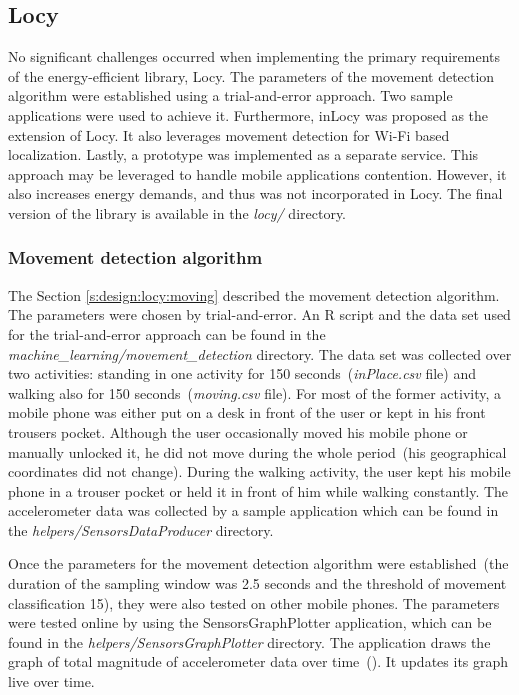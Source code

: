 \subsection{Locy}
\hspace{10pt} No significant challenges occurred when implementing the primary requirements of the energy-efficient library, Locy. The parameters of the movement detection algorithm were established using a trial-and-error approach. Two sample applications were used to achieve it. Furthermore, inLocy was proposed as the extension of Locy. It also leverages movement detection for Wi-Fi based localization. Lastly, a prototype was implemented as a separate service. This approach may be leveraged to handle mobile applications contention. However, it also increases energy demands, and thus was not incorporated in Locy. The final version of the library is available in the \textit{locy/} directory. 

\subsubsection{Movement detection algorithm}
\label{s:implementation:moving}
\hspace{10pt} The Section \ref{s:design:locy:moving} described the movement detection algorithm. The parameters were chosen by trial-and-error. An R script and the data set used for the trial-and-error approach can be found in the \textit{machine\_learning/movement\_detection} directory. The data set was collected over two activities: standing in one activity for 150 seconds\ (\textit{inPlace.csv} file) and walking also for 150 seconds\ (\textit{moving.csv} file). For most of the former activity, a mobile phone was either put on a desk in front of the user or kept in his front trousers pocket. Although the user occasionally moved his mobile phone or manually unlocked it, he did not move during the whole period\ (his geographical coordinates did not change). During the walking activity, the user kept his mobile phone in a trouser pocket or held it in front of him while walking constantly. The accelerometer data was collected by a sample application which can be found in the \textit{helpers/SensorsDataProducer} directory.

Once the parameters for the movement detection algorithm were established\ (the duration of the sampling window was 2.5 seconds and the threshold of movement classification 15), they were also tested on other mobile phones. The parameters were tested online by using the SensorsGraphPlotter application, which can be found in the \textit{helpers/SensorsGraphPlotter} directory. The application draws the graph of total magnitude of accelerometer data over time\ (). It updates its graph live over time.

